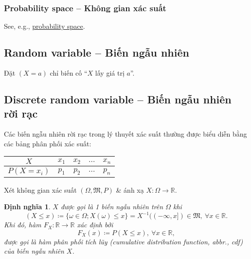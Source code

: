 \documentclass{article}
\newtheorem{dinhnghia}{Định nghĩa}
\begin{document}
\subsubsection{Probability space -- Không gian xác suất}
See, e.g., \href{https://en.wikipedia.org/wiki/Probability_space}{probability space}.


\subsection{Random variable -- Biến ngẫu nhiên}
Đặt $(X = a)$ chỉ biến cố ``$X$ lấy giá trị $a$''.


\subsection{Discrete random variable -- Biến ngẫu nhiên rời rạc}
Các biến ngẫu nhiên rời rạc trong lý thuyết xác suất thường được biểu diễn bằng các bảng phân phối xác suất:
\begin{table}[H]
	\centering
	\begin{tabular}{|c|c|c|c|c|}
		\hline
		$X$ & $x_1$ & $x_2$ & $\ldots$ & $x_n$ \\
		\hline
		$P(X = x_i)$ & $p_1$ & $p_2$ & $\ldots$ & $p_n$ \\
		\hline
	\end{tabular}
\end{table}
Xét không gian xác suất $(\Omega,\mathfrak{M},P)$ \& ánh xạ $X:\Omega\to\mathbb{R}$.

\begin{dinhnghia}
	$X$ được gọi là 1 {\rm biến ngẫu nhiên} trên $\Omega$ khi
	\begin{equation*}
		(X\le x)\coloneqq\{\omega\in\Omega;X(\omega)\le x\} = X^{-1}((-\infty,x])\in\mathfrak{M},\ \forall x\in\mathbb{R}.
	\end{equation*}
	Khi đó, hàm $F_X:\mathbb{R}\to\mathbb{R}$ xác định bởi
	\begin{equation}
		\label{cdf}
		\tag{cdf}
		F_X(x)\coloneqq P(X\le x),\ \forall x\in\mathbb{R},
	\end{equation}
	được gọi là {\rm hàm phân phối tích lũy (cumulative distribution function, abbr., cdf)} của biến ngẫu nhiên $X$.
\end{dinhnghia}
\end{document}
